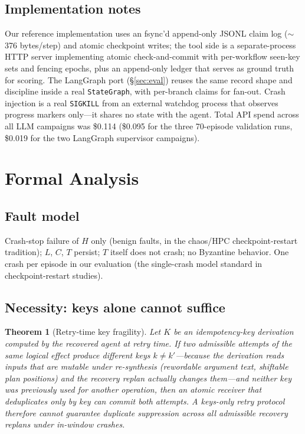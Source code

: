 \documentclass[10pt,journal,compsoc]{IEEEtran}
\newtheorem{theorem}{Theorem}
\begin{document}
\subsection{Implementation notes}

Our reference implementation uses an fsync'd append-only JSONL
claim log ($\sim$376 bytes/step) and atomic checkpoint writes;
the tool side is a separate-process HTTP server implementing
atomic check-and-commit with per-workflow seen-key sets and
fencing epochs, plus an append-only ledger that serves as
ground truth for scoring. The LangGraph port
(\S\ref{sec:eval}) reuses the same record shape and
discipline inside a real \texttt{StateGraph}, with per-branch
claims for fan-out. Crash injection is a real
\texttt{SIGKILL} from an external watchdog process that
observes progress markers only---it shares no state with the
agent. Total API spend across all LLM campaigns was \$0.114
(\$0.095 for the three 70-episode validation runs, \$0.019 for
the two LangGraph supervisor campaigns).

\section{Formal Analysis}
\label{sec:formal}

\subsection{Fault model}

Crash-stop failure of $H$ only (benign faults, in the
chaos/HPC checkpoint-restart tradition); $L$, $C$, $T$ persist;
$T$ itself does not crash; no Byzantine behavior. One crash per
episode in our evaluation (the single-crash model standard in
checkpoint-restart studies).

\subsection{Necessity: keys alone cannot suffice}

\begin{theorem}[Retry-time key fragility]
Let $K$ be an idempotency-key derivation computed by the
\emph{recovered} agent at retry time. If two admissible attempts
of the \emph{same} logical effect produce \emph{different} keys
$k \ne k'$---because the derivation reads inputs that are mutable
under re-synthesis (rewordable argument text, shiftable plan
positions) \emph{and} the recovery replan actually changes
them---and neither key was previously used for another operation,
then an atomic receiver that deduplicates only by key can commit
both attempts. A keys-only retry protocol therefore cannot
guarantee duplicate suppression across all admissible recovery
replans under in-window crashes.
\end{theorem}
\end{document}
